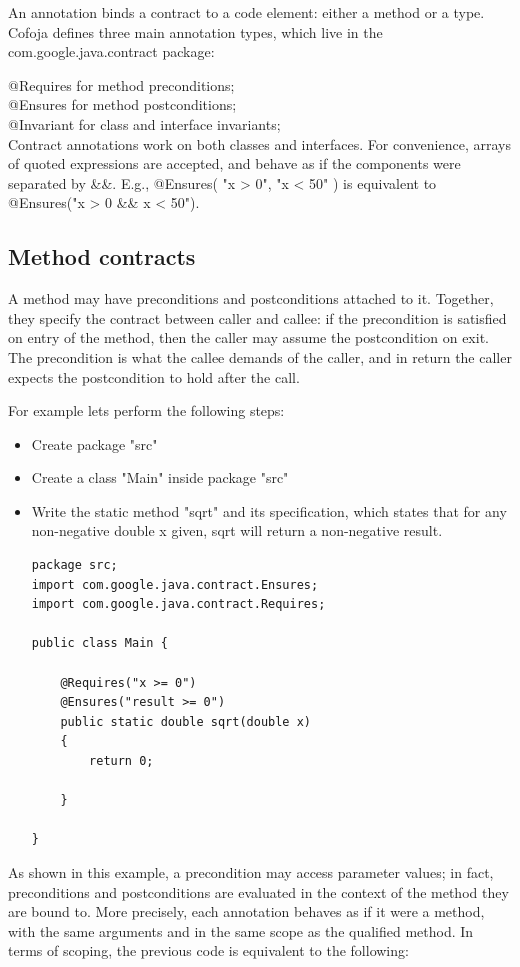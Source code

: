 \documentclass{article}
\begin{document}
An annotation binds a contract to a code element: either a method or a type. Cofoja defines three main annotation types, which live in the com.google.java.contract package:

@Requires for method preconditions;\\
@Ensures for method postconditions;\\
@Invariant for class and interface invariants;\\

Contract annotations work on both classes and interfaces. For convenience, arrays of quoted expressions are accepted, and behave as if the components were separated by \&\&. E.g., @Ensures({ "x > 0", "x < 50" }) is equivalent to @Ensures("x > 0 \&\& x < 50").

\subsection{Method contracts}

A method may have preconditions and postconditions attached to
it. Together, they specify the contract between caller and callee: if
the precondition is satisfied on entry of the method, then the caller
may assume the postcondition on exit. The precondition is what the
callee demands of the caller, and in return the caller expects the
postcondition to hold after the call.

For example lets perform the following steps:
 \begin{itemize}
\item Create package "src"
\item Create a class "Main" inside package "src"
\item Write the static method "sqrt" and its specification, which states
that for any non-negative double x given, sqrt will return a
non-negative result. 
\begin{lstlisting}
package src;
import com.google.java.contract.Ensures;
import com.google.java.contract.Requires;

public class Main {

	@Requires("x >= 0")
	@Ensures("result >= 0")
	public static double sqrt(double x)
	{
		return 0;
		
	}
	
}
\end{lstlisting}
\end{itemize}

As shown in this example, a precondition may access parameter values; in fact, preconditions and postconditions are evaluated in the context of the method they are bound to. More precisely, each annotation behaves as if it were a method, with the same arguments and in the same scope as the qualified method. In terms of scoping, the previous code is equivalent to the following:
\end{document}
